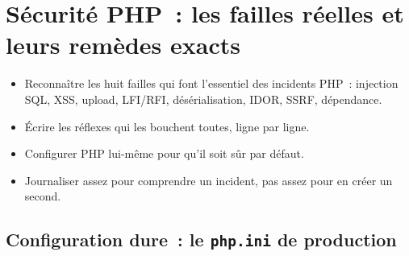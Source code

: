 \documentclass[12pt,a4paper,twoside,openright]{book}
\newcommand{\fichier}[1]{\texttt{\color{pathgreen}#1}}
\begin{document}
\chapter{S\'ecurit\'e PHP~: les failles r\'eelles et leurs rem\`edes exacts}
\label{ch-php-secu}

\begin{objectif}
\begin{itemize}
  \item Reconna\^itre les huit failles qui font l'essentiel des incidents PHP~: injection SQL,
        XSS, upload, LFI/RFI, d\'es\'erialisation, IDOR, SSRF, d\'ependance.
  \item \'Ecrire les r\'eflexes qui les bouchent toutes, ligne par ligne.
  \item Configurer PHP lui-m\^eme pour qu'il soit s\^ur par d\'efaut.
  \item Journaliser assez pour comprendre un incident, pas assez pour en cr\'eer un second.
\end{itemize}
\end{objectif}

\section{Configuration dure~: le \fichier{php.ini} de production}
\end{document}
